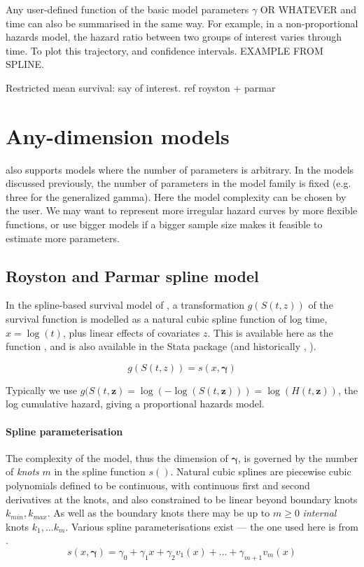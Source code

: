 \documentclass[nojss,nofooter]{jss}
\begin{document}
Any user-defined function of the basic model parameters $\gamma$ OR
WHATEVER and time can also be summarised in the same way.  For
example, in a non-proportional hazards model, the hazard ratio between
two groups of interest varies through time.  To plot this trajectory,
and confidence intervals.   EXAMPLE FROM SPLINE. 

Restricted mean survival: say of interest. ref royston + parmar


\section{Any-dimension models}

 also supports models where the number of parameters is
arbitrary.  In the models discussed previously, the number of
parameters in the model family is fixed (e.g. three for the
generalized gamma).  Here the model complexity can be chosen by the
user.  We may want to represent more irregular hazard
curves by more flexible functions, or use bigger models if a bigger
sample size makes it feasible to estimate more parameters.


\subsection{Royston and Parmar spline model}

In the spline-based survival model of \citet{royston:parmar}, a
transformation $g(S(t,z))$ of the survival function is modelled as a
natural cubic spline function of log time, $x = \log(t)$, plus linear
effects of covariates $z$.  This is available here as the function
,  and is also available in the Stata package
 \citep{stpm2} (and historically , \citet{stpm:orig,stpm:update}).

  \[g(S(t,z)) = s(x, \bm{\gamma})\]

Typically we use $g(S(t,\mathbf{z}) = \log(-\log(S(t,\mathbf{z}))) =
\log(H(t,\mathbf{z}))$, the log cumulative hazard, giving a
proportional hazards model.    

\paragraph{Spline parameterisation}
The complexity of the model, thus the dimension of $\bm{\gamma}$, is
governed by the number of \emph{knots} $m$ in the spline function
$s()$.  Natural cubic splines are piecewise cubic polynomials defined
to be continuous, with continuous first and second derivatives at the
knots, and also constrained to be linear beyond boundary knots
$k_{min},k_{max}$.  As well as the boundary knots there may be up to
$m\geq 0$ \emph{internal} knots $k_1,\ldots k_m$.  Various spline
parameterisations exist --- the one used here is from
\citet{royston:parmar}.
\begin{equation}
  \label{eq:spline}
  s(x,\bm{\gamma}) = \gamma_0 + \gamma_1 x + \gamma_2 v_1(x) + \ldots + \gamma_{m+1} v_m(x)   
\end{equation}
\end{document}
